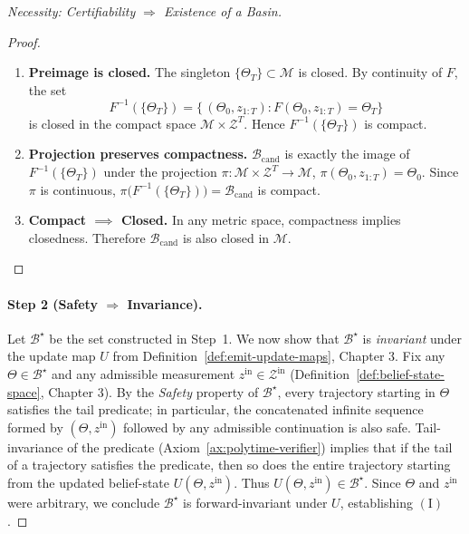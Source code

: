 \documentclass[12pt]{article}
\theoremstyle{definition}
\theoremstyle{plain}
\begin{document}
\begin{proof}[Necessity: Certifiability $\Rightarrow$ Existence of a Basin]
\begin{proof}
\begin{enumerate}
  \item \textbf{Preimage is closed.}  
    The singleton \(\{\Theta_{T}\}\subset\mathcal M\) is closed.  
    By continuity of \(F\), the set
    \[
      F^{-1}(\{\Theta_{T}\})
      = \{\,(\Theta_{0},z_{1:T}) : F(\Theta_{0},z_{1:T})=\Theta_T\}
    \]
    is closed in the compact space \(\mathcal M\times\mathcal Z^T\).  Hence \(F^{-1}(\{\Theta_T\})\) is compact.

  \item \textbf{Projection preserves compactness.}  
    \(\mathcal{B}_{\mathrm{cand}}\) is exactly the image of \(F^{-1}(\{\Theta_T\})\) under the projection
    \(\pi:\mathcal M\times\mathcal Z^T\to\mathcal M\), \(\pi(\Theta_{0},z_{1:T})=\Theta_{0}\).  
    Since \(\pi\) is continuous, \(\pi\bigl(F^{-1}(\{\Theta_T\})\bigr)=\mathcal{B}_{\mathrm{cand}}\) is compact.

  \item \textbf{Compact \(\implies\) Closed.}  
    In any metric space, compactness implies closedness.  Therefore \(\mathcal{B}_{\mathrm{cand}}\) is also closed in \(\mathcal M\).
\end{enumerate}
\end{proof}



\paragraph{Step 2 (Safety $\Rightarrow$ Invariance).}
Let $\mathcal{B}^\star$ be the set constructed in Step~1.  
We now show that $\mathcal{B}^\star$ is \emph{invariant} under the update map $U$ from Definition~\ref{def:emit-update-maps}, Chapter 3.  
Fix any $\Theta \in \mathcal{B}^\star$ and any admissible measurement $z^{\mathrm{in}}\in\mathcal{Z}^{\mathrm{in}}$ (Definition~\ref{def:belief-state-space}, Chapter 3).  
By the \emph{Safety} property of $\mathcal{B}^\star$, every trajectory starting in $\Theta$ satisfies the tail predicate; in particular, the concatenated infinite sequence formed by $(\Theta, z^{\mathrm{in}})$ followed by any admissible continuation is also safe.  
Tail-invariance of the predicate (Axiom~\ref{ax:polytime-verifier}) implies that if the tail of a trajectory satisfies the predicate, then so does the entire trajectory starting from the updated belief-state $U(\Theta, z^{\mathrm{in}})$.  
Thus $U(\Theta, z^{\mathrm{in}}) \in \mathcal{B}^\star$.  
Since $\Theta$ and $z^{\mathrm{in}}$ were arbitrary, we conclude $\mathcal{B}^\star$ is forward-invariant under $U$, establishing $(\mathrm{I})$.



\end{proof}
\end{document}

